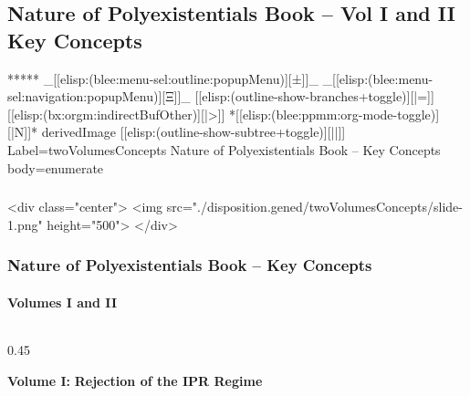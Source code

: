 \begin{whenOrg}
\section{Nature of Polyexistentials Book -- Vol I and II Key Concepts}


\begin{whenOrg}
*****  _[[elisp:(blee:menu-sel:outline:popupMenu)][±]]_ _[[elisp:(blee:menu-sel:navigation:popupMenu)][Ξ]]_ [[elisp:(outline-show-branches+toggle)][|=]] [[elisp:(bx:orgm:indirectBufOther)][|>]] *[[elisp:(blee:ppmm:org-mode-toggle)][|N]]*  derivedImage [[elisp:(outline-show-subtree+toggle)][||]] Label=twoVolumesConcepts Nature of Polyexistentials Book -- Key Concepts body=enumerate
\end{whenOrg}

\begin{htmlonly}

\begin{frame}[fragile,plain,label=twoVolumesConcepts]
    \frametitle{}
    \framesubtitle{}
    \begin{rawhtml}
<div class="center">
<img src="./disposition.gened/twoVolumesConcepts/slide-1.png" height="500">
</div>
    \end{rawhtml}
\end{frame}
\end{htmlonly}

\begin{verblatex}

\begin{frame}[fragile,plain,label=twoVolumesConcepts]
    \frametitle{Nature of Polyexistentials Book -- Key Concepts}
    \framesubtitle{Volumes I and II}


    \begin{columns}

      \begin{column}{0.45\textwidth}

        \begin{center}
          \colorbox{blue!30}{\color{black} \textbf{Volume I:}}
          \colorbox{blue!30}{\color{black} \textbf{Rejection of the IPR Regime}}
        \end{center}
      \end{column}


\end{columns}
\end{frame}
\end{verblatex}
\end{whenOrg}
